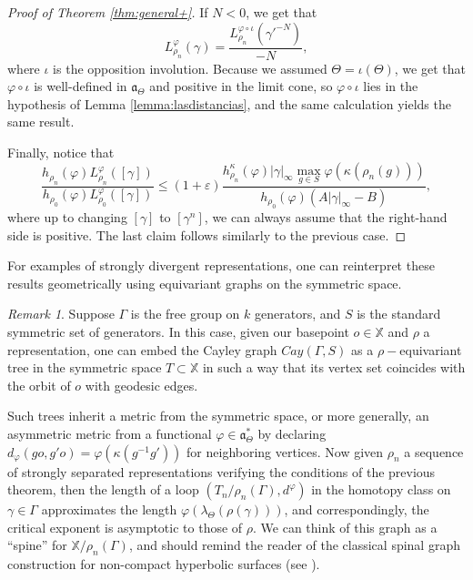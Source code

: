 \documentclass{amsart}
\theoremstyle{remark}
\newtheorem{rmk}[thm]{Remark}
\theoremstyle{definition}
\begin{document}
\begin{proof}[Proof of Theorem \ref{thm:general+}]
If $N < 0$, we get that $$L^\varphi_{\rho_n}(\gamma) = \frac{L^{\varphi \circ \iota}_{\rho_n}(\gamma'^{-N})}{-N},$$
where $\iota$ is the opposition involution. Because we assumed $\Theta = \iota(\Theta)$, we get that $\varphi \circ \iota$ is well-defined in $\mathfrak{a}_\Theta$ and positive in the limit cone, so $\varphi \circ \iota$ lies in the hypothesis of Lemma \ref{lemma:lasdistancias}, and the same calculation yields the same result.

Finally, notice that
$$\frac{h_{\rho_n} (\varphi) L_{\rho_n}^\varphi ([\gamma])}{h_{\rho_0} (\varphi) L_{\rho_0}^\varphi ([\gamma])} \leq (1 + \varepsilon) \frac{h_{\rho_n}^\kappa (\varphi) |\gamma|_\infty \max_{g \in S} \varphi (\kappa (\rho_n (g)))}{h_{\rho_0} (\varphi)(A |\gamma|_\infty - B)},$$
where up to changing $[\gamma]$ to $[\gamma^n]$, we can always assume that the right-hand side is positive. 
The last claim follows similarly to the previous case.
\end{proof}

For examples of strongly divergent representations, one can reinterpret these results geometrically using equivariant graphs on the symmetric space.

\begin{rmk}
Suppose $\Gamma$ is the free group on $k$ generators, and $S$ is the standard symmetric set of generators.
In this case, given our basepoint $o \in \mathbb{X}$ and $\rho$ a representation, one can embed the Cayley graph $Cay (\Gamma, S)$ as a $\rho-$equivariant tree in the symmetric space $T \subset \mathbb{X}$ in such a way that its vertex set coincides with the orbit of $o$ with geodesic edges.

Such trees inherit a metric from the symmetric space, or more generally, an asymmetric metric from a functional $\varphi \in \mathfrak{a}_\Theta^*$ by declaring $d_\varphi (go,g'o) = \varphi (\kappa (g^{-1}g'))$ for neighboring vertices.
Now given $\rho_n$ a sequence of strongly separated representations verifying the conditions of the previous theorem, then the length of a loop $(T_n/\rho_n (\Gamma), d^\varphi)$ in the homotopy class on $\gamma \in \Gamma$ approximates the length $\varphi (\lambda_\Theta (\rho (\gamma)))$, and correspondingly, the critical exponent is asymptotic to those of $\rho$.
We can think of this graph as a ``spine'' for $\mathbb{X}/\rho_n (\Gamma)$, and should remind the reader of the classical spinal graph construction for non-compact hyperbolic surfaces (see \cite{bowditch1988natural}).
\end{rmk}
\end{document}
